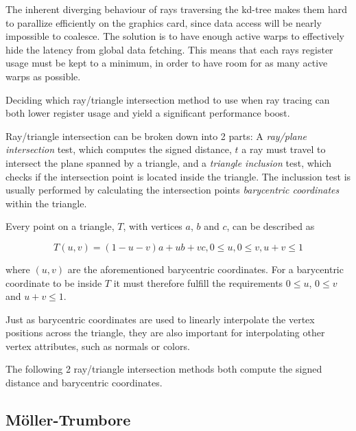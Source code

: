 The inherent diverging behaviour of rays traversing the kd-tree makes them hard
to parallize efficiently on the graphics card, since data access will be nearly
impossible to coalesce. The solution is to have enough active warps to
effectively hide the latency from global data fetching. This means that each
rays register usage must be kept to a minimum, in order to have room for as many
active warps as possible.

Deciding which ray/triangle intersection method to use when ray tracing can both
lower register usage and yield a significant performance boost.


Ray/triangle intersection can be broken down into 2 parts: A \textit{ray/plane
  intersection} test, which computes the signed distance, $t$ a ray must travel
to intersect the plane spanned by a triangle, and a \textit{triangle inclusion}
test, which checks if the intersection point is located inside the triangle. The
inclussion test is usually performed by calculating the intersection points
\textit{barycentric coordinates} within the triangle.

Every point on a triangle, $T$, with vertices $a$, $b$ and $c$, can be described
as

\begin{displaymath}
  T(u,v) = (1-u-v)a + ub + vc, 0 \le u, 0 \le v, u+v \le 1
\end{displaymath}
 
where $(u, v)$ are the aforementioned barycentric coordinates. For a barycentric
coordinate to be inside $T$ it must therefore fulfill the requirements $0 \le
u$, $0 \le v$ and $u+v \le 1$.

Just as barycentric coordinates are used to linearly interpolate the vertex
positions across the triangle, they are also important for interpolating other
vertex attributes, such as normals or colors.

The following 2 ray/triangle intersection methods both compute the signed
distance and barycentric coordinates.

\subsection{Möller-Trumbore}


